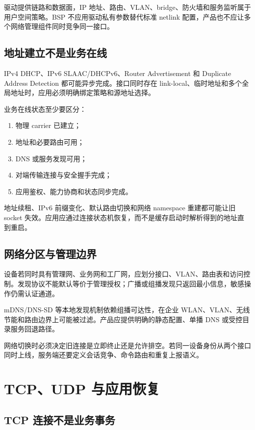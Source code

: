 驱动提供链路和数据面，IP 地址、路由、VLAN、bridge、防火墙和服务监听属于用户空间策略。BSP 不应用驱动私有参数替代标准 netlink 配置，产品也不应让多个网络管理组件同时竞争同一接口。

\subsection{地址建立不是业务在线}

IPv4 DHCP、IPv6 SLAAC/DHCPv6、Router Advertisement 和 Duplicate Address Detection 都可能异步完成。接口同时存在 link-local、临时地址和多个全局地址时，应用必须明确绑定策略和源地址选择。

业务在线状态至少要区分：

\begin{enumerate}
  \item 物理 carrier 已建立；
  \item 地址和必要路由可用；
  \item DNS 或服务发现可用；
  \item 对端传输连接与安全握手完成；
  \item 应用鉴权、能力协商和状态同步完成。
\end{enumerate}

地址续租、IPv6 前缀变化、默认路由切换和网络 namespace 重建都可能让旧 socket 失效。应用应通过连接状态机恢复，而不是缓存启动时解析得到的地址直到重启。

\subsection{网络分区与管理边界}

设备若同时具有管理网、业务网和工厂网，应划分接口、VLAN、路由表和访问控制。发现协议不能默认等价于管理授权；广播或组播发现只返回最小信息，敏感操作仍需认证通道。

mDNS/DNS-SD 等本地发现机制依赖组播可达性，在企业 WLAN、VLAN、无线节能和路由边界上可能被过滤。产品应提供明确的静态配置、单播 DNS 或受控目录服务回退路径。

网络切换时必须决定旧连接是立即终止还是允许排空。若同一设备身份从两个接口同时上线，服务端还要定义会话竞争、命令路由和重复上报语义。

\section{TCP、UDP 与应用恢复}

\subsection{TCP 连接不是业务事务}


